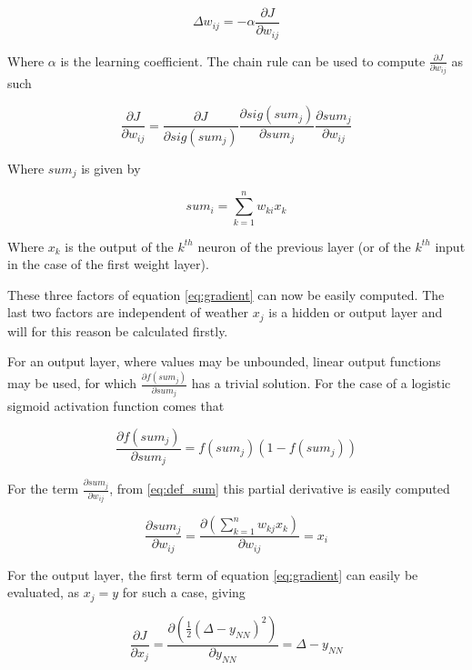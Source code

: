 \begin{equation}\label{eq:update_law}
\Delta w_{ij} = - \alpha \frac{\partial J}{\partial w_{ij}}
\end{equation}

Where $\alpha$ is the learning coefficient. The chain rule can be used to compute $\frac{\partial J}{\partial w_{ij}}$ as such

\begin{equation}\label{eq:gradient}
\frac{\partial J}{\partial w_{ij}} = \frac{\partial J}{\partial sig(sum_j)}\frac{\partial sig(sum_j)}{\partial sum_j}\frac{\partial sum_j}{\partial w_{ij}}
\end{equation}

Where $sum_j$ is given by

\begin{equation}\label{eq:def_sum}
sum_i = \sum ^n_{k=1} w_{ki} x_k
\end{equation}

Where $x_k$ is the output of the $k^{th}$ neuron of the previous layer (or of the $k^{th}$ input in the case of the first weight layer).

These three factors of equation \ref{eq:gradient} can now be easily computed. The last two factors are independent of weather $x_j$ is a hidden or output layer and will for this reason be calculated firstly. 

For an output layer, where values may be unbounded, linear output functions may be used, for which $\frac{\partial f(sum_j)}{\partial sum_j}$ has a trivial solution. For the case of a logistic sigmoid activation function comes that 

\begin{equation}
\frac{\partial f(sum_j)}{\partial sum_j}=f(sum_j)(1-f(sum_j))
\end{equation}

For the term $\frac{\partial sum_j}{\partial w_{ij}}$, from \ref{eq:def_sum} this partial derivative is easily computed

\begin{equation}
\frac{\partial sum_j}{\partial w_{ij}} = \frac{\partial \left(\sum ^n_{k=1} w_{kj} x_k\right)}{\partial w_{ij}} = x_i
\end{equation}

For the output layer, the first term of equation \ref{eq:gradient} can easily be evaluated, as $x_j=y$ for such a case, giving

\begin{equation}
\frac{\partial J}{\partial x_j}=\frac{\partial (\frac{1}{2} (\Delta-y_{NN})^2)}{\partial y_{NN}}= \Delta-y_{NN}
\end{equation}

